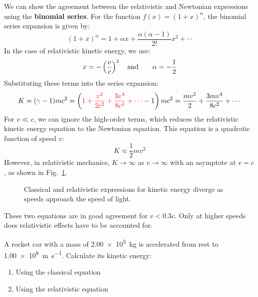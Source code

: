 We can show the agreement between the relativistic and Newtonian expressions
using the \textbf{binomial series}. For the function $f(x)=(1+x)^\alpha$, the
binomial series expansion is given by:
\begin{equation}  
  (1+x)^\alpha=
  1+\alpha x + \frac{\alpha(\alpha-1)}{2!}x^2+\cdots
\end{equation}
In the case of relativistic kinetic energy, we use:
\begin{equation*}
  x=-\left(\frac vc\right)^2\quad\text{\normalsize and}\quad\quad
  \alpha=-\frac12
\end{equation*}
Substituting these terms into the series expansion:
\begin{equation*}
  K
  =({\color{red}\gamma}-1) mc^2
  = \left({\color{red}1+\frac{v^2}{2c^2}+\frac{3v^4}{8c^4}+\cdots}-1
  \right)mc^2
  =\frac{mv^2}2+\frac{3mv^4}{8c^2}+\cdots
\end{equation*}
For $v\ll c$, we can ignore the high-order terms, which reduces the
relativistic kinetic energy equation to the Newtonian equation. This equation
is a quadratic function of speed $v$:
\begin{equation*}
  K\approx\frac12mv^2
\end{equation*}
However, in relativistic mechanics, $K\rightarrow\infty$ as
$v\rightarrow\infty$ with an asymptote at $v=c$, as shown in
Fig.~\ref{fig:kinetic-energy}.
\begin{figure}[ht]
  \centering
  \caption{Classical and relativistic expressions for kinetic energy diverge
    as speeds approach the speed of light.}
  \label{fig:kinetic-energy}
\end{figure} 
These two equations are in good agreement for $v<0.3c$. Only at higher speeds
does relativistic effects have to be accounted for.



\begin{example}
  A rocket car with a mass of \SI{2.00e3}{\kilo\gram} is accelerated from rest
  to \SI{1.00e8}{\metre\per\second}. Calculate its kinetic energy:
  \begin{enumerate}
  \item Using the classical equation
  \item Using the relativistic equation
  \end{enumerate}
\end{example}
